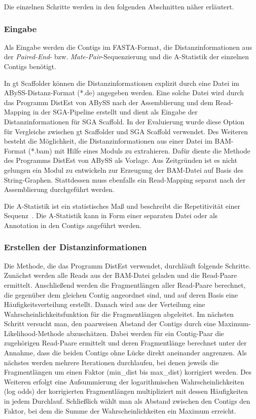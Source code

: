 \documentclass[a4paper,11pt,parskip]{scrartcl}
\begin{document}
Die einzelnen Schritte werden in den folgenden Abschnitten näher erläutert.

\subsubsection{Eingabe}
Als Eingabe werden die Contigs im FASTA-Format, die
Distanzinformationen aus der \textit{Paired-End}-
bzw. \textit{Mate-Pair}-Sequenzierung und die A-Statistik der einzelnen
Contigs benötigt.

In gt Scaffolder können die Distanzinformationen explizit durch eine
Datei im ABySS-Distanz-Format (*.de) angegeben werden. Eine solche
Datei wird durch das Programm DistEst von ABySS nach der Assemblierung
und dem Read-Mapping in der SGA-Pipeline erstellt und dient als
Eingabe der Distanzinformationen für SGA Scaffold. In der Evaluierung
wurde diese Option für Vergleiche zwischen gt Scaffolder und SGA Scaffold
verwendet. Des Weiteren besteht die Möglichkeit, die Distanzinformationen aus
einer Datei im BAM-Format (*.bam) mit Hilfe eines Moduls zu
extrahieren. Dafür diente die Methode des Programms DistEst von ABySS
als Vorlage. Aus Zeitgründen ist es nicht gelungen ein Modul zu
entwickeln zur Erzeugung der BAM-Datei auf Basis des String-Graphen.
Stattdessen muss ebenfalls ein Read-Mapping separat nach der Assemblierung
durchgeführt werden.

Die A-Statistik ist ein statistisches Maß und beschreibt die Repetitivität
einer Sequenz~\cite{Myers:2005iq}. Die A-Statistik kann in Form einer
separaten Datei oder als Annotation in den Contigs angeführt werden.

\subsubsection{Erstellen der Distanzinformationen}
Die Methode, die das Programm DistEst verwendet, durchläuft folgende
Schritte. Zunächst werden alle Reads aus der BAM-Datei geladen und
die Read-Paare ermittelt. Anschließend werden die Fragmentlängen
aller Read-Paare berechnet, die gegenüber dem gleichen Contig angeordnet sind,
und auf deren Basis eine Häufigkeitsverteilung erstellt.
Danach wird aus der Verteilung eine Wahrscheinlichkeitsfunktion für die
Fragmentlängen abgeleitet. Im nächsten Schritt versucht man, den paarweisen
Abstand der Contigs durch eine Maximum-Likelihood-Methode abzuschätzen.
Dabei werden für ein Contig-Paar die zugehörigen Read-Paare ermittelt und
deren Fragmentlänge berechnet unter der Annahme, dass die beiden Contigs
ohne Lücke direkt aneinander angrenzen. Als nächstes werden mehrere
Iterationen durchlaufen, bei denen jeweils die Fragmentlängen um einen Faktor (min\_dist
bis max\_dist) korrigiert werden. Des Weiteren erfolgt eine Aufsummierung
der logarithmischen Wahrscheinlichkeiten (log odds) der korrigierten
Fragmentlängen multipliziert mit dessen Häufigkeiten in jedem Durchlauf.
Schließlich wählt man als Abstand zwischen den Contigs den Faktor, bei
dem die Summe der Wahrscheinlichkeiten ein Maximum erreicht.
\end{document}
